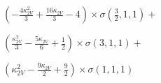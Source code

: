 $\left(- \frac{4 \kappa_{2V}^{2}}{3} + \frac{16 \kappa_{2V}}{3} - 4\right) \times \sigma{\left(\frac{3}{2},1,1 \right)} +$

$ \left(\frac{\kappa_{2V}^{2}}{3} - \frac{5 \kappa_{2V}}{6} + \frac{1}{2}\right) \times \sigma{\left(3,1,1 \right)} +$

$ \left(\kappa_{2V}^{2} - \frac{9 \kappa_{2V}}{2} + \frac{9}{2}\right) \times \sigma{\left(1,1,1 \right)}$
